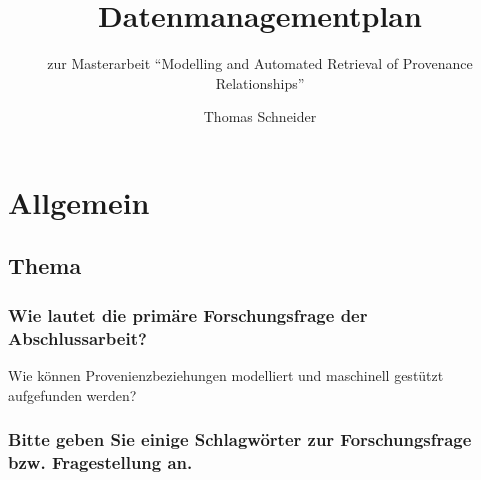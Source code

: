 \documentclass[%
  11pt,
  DIV=16,
  a4paper,
  BCOR=15mm,
  twoside=on,
  bibliography=totoc,
  headings=normal,
  numbers=noendperiod,
]{scrartcl}
\title{Datenmanagementplan}
\subtitle{zur Masterarbeit \enquote{Modelling and Automated Retrieval of Provenance Relationships}}
\author{Thomas Schneider}
\begin{document}
\maketitle

\section{Allgemein}

\subsection{Thema}

\subsubsection{Wie lautet die primäre Forschungsfrage der Abschlussarbeit?}

Wie können Provenienzbeziehungen modelliert und maschinell gestützt aufgefunden werden?

\subsubsection{Bitte geben Sie einige Schlagwörter zur Forschungsfrage bzw. Fragestellung an.}
\end{document}
